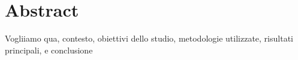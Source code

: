 \chapter*{Abstract}
\label{cha:abtract}

Vogliiamo qua, contesto, obiettivi dello studio, metodologie utilizzate, risultati principali, e conclusione